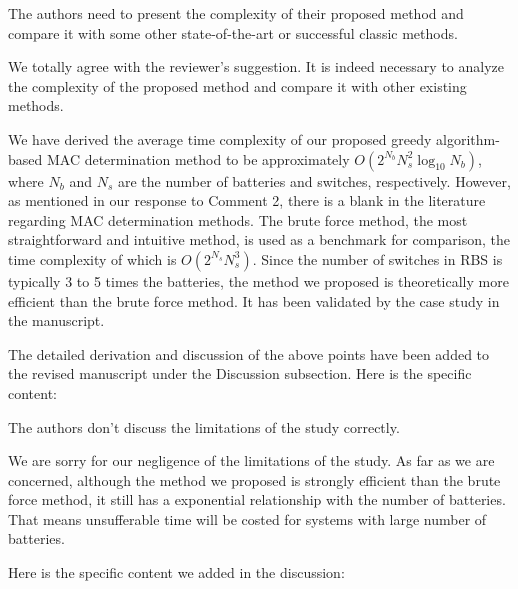 \begin{revcomment}
  The authors need to present the complexity of their proposed method and compare it with some other state-of-the-art or successful classic methods.
\end{revcomment}
\begin{revresponse}

We totally agree with the reviewer's suggestion.
It is indeed necessary to analyze the complexity of the proposed method and compare it with other existing methods.


We have derived the average time complexity of our proposed greedy algorithm-based MAC determination method to be approximately $O(2^{N_b}N_s^2\log_{10} N_b)$, where $N_b$ and $N_s$ are the number of batteries and switches, respectively.
However, as mentioned in our response to Comment 2, there is a blank in the literature regarding MAC determination methods.
The brute force method, the most straightforward and intuitive method, is used as a benchmark for comparison, the time complexity of which is $O(2^{N_s}N_s^3)$.
Since the number of switches in RBS is typically 3 to 5 times the batteries, the method we proposed is theoretically more efficient than the brute force method.
It has been validated by the case study in the manuscript.


The detailed derivation and discussion of the above points have been added to the revised manuscript under the Discussion subsection.
Here is the specific content:
\begin{changes}
\end{changes}

\end{revresponse}

\begin{revcomment}
  The authors don't discuss the limitations of the study correctly.
\end{revcomment}
\begin{revresponse}

We are sorry for our negligence of the limitations of the study. 
As far as we are concerned, although the method we proposed is strongly efficient than the brute force method, it still has a exponential relationship with the number of batteries.
That means unsufferable time will be costed for systems with large number of batteries.


Here is the specific content we added in the discussion:
\begin{changes}
\end{changes}

\end{revresponse}


